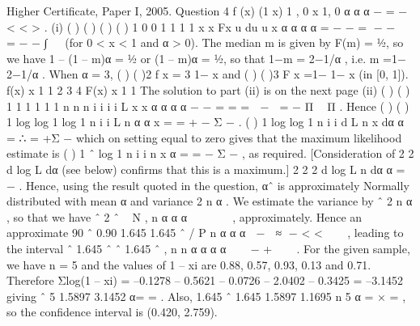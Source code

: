 Higher Certificate, Paper I, 2005. Question 4
f (x) (1 x) 1 , 0 x 1, 0 α α α − = − < < > .
(i) ( ) ( ) ( ) ( ) 1
0 0
1 1 1 1
x x Fx u du u x α α α α = − − = − −  = − − ∫   (for 0 < x < 1 and α > 0).
The median m is given by F(m) = ½, so we have 1 – (1 – m)α = ½ or (1 – m)α = ½,
so that 1−m = 2−1/α , i.e. m =1− 2−1/α .
When α = 3, ( ) ( )2 f x = 3 1− x and ( ) ( )3 F x =1− 1− x (in [0, 1]).
f(x)
x
1
1
2
3
4
F(x)
x
1
1
The solution to part (ii) is on the next page
(ii) ( ) ( ) 1 1
1 1
1 1
n n
n
i i
i i
L x x α α α α − −
= =
=  −  = − Π  Π .
Hence ( ) ( )
1
log log 1 log 1
n
i
i
L n α α x
=
= + − Σ − .
( )
1
log log 1
n
i
i
d L n x
dα α =
∴ = +Σ − which on setting equal to zero gives that the maximum
likelihood estimate is
( )
1
ˆ
log 1
n
i
i
n
x
α
=
= −
Σ −
, as required. [Consideration of
2
2
d log L
dα
(see below) confirms that this is a maximum.]
2
2 2
d log L n
dα α
= − . Hence, using the result quoted in the question, αˆ is approximately
Normally distributed with mean α and variance
2
n
α . We estimate the variance by
ˆ 2
n
α ,
so that we have
ˆ 2 ˆ ~ N ,
n
α α α
 
 
 
, approximately.
Hence an approximate 90%
ˆ
0.90 1.645 1.645
ˆ /
P
n
α α
α
 −  ≈ − < < 
 
,
leading to the interval
ˆ 1.645 ˆ ˆ 1.645 ˆ ,
n n
α α α α    − + 
 
.
For the given sample, we have n = 5 and the values of 1 – xi are 0.88, 0.57, 0.93, 0.13
and 0.71. Therefore
Σlog(1 – xi) = –0.1278 – 0.5621 – 0.0726 – 2.0402 – 0.3425 = –3.1452
giving ˆ 5 1.5897
3.1452
α= = .
Also,
1.645 ˆ 1.645 1.5897 1.1695
n 5
α = × = , so the confidence interval is (0.420, 2.759).
